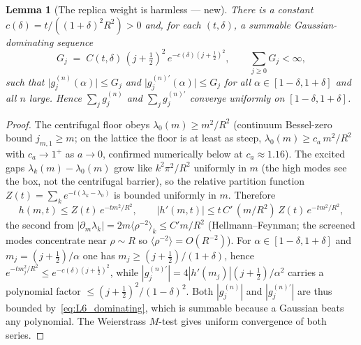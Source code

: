 \documentclass[11pt,a4paper]{article}
\theoremstyle{plain}
\newtheorem{lemma}[theorem]{Lemma}
\theoremstyle{definition}
\renewcommand{\_}{\textunderscore\allowbreak}
\begin{document}
\begin{lemma}[The replica weight is harmless --- new]
\label{lem:L6_harmless}
There is a constant $c(\delta)=t/((1+\delta)^2 R^2)>0$ and, for each $(t,\delta)$,
a summable Gaussian-dominating sequence
\begin{equation}
\label{eq:L6_dominating}
G_j \;=\; C(t,\delta)\,(j+\tfrac12)^2\,e^{-c(\delta)(j+\frac12)^2},
\qquad \sum_{j\ge0}G_j<\infty,
\end{equation}
such that $\big|g_j^{(n)}(\alpha)\big|\le G_j$ and
$\big|g_j^{(n)\prime}(\alpha)\big|\le G_j$ for all $\alpha\in[1-\delta,1+\delta]$
and all $n$ large. Hence $\sum_j g_j^{(n)}$ and $\sum_j g_j^{(n)\prime}$ converge
uniformly on $[1-\delta,1+\delta]$.
\end{lemma}

\begin{proof}
The centrifugal floor obeys $\lambda_0(m)\ge m^2/R^2$ (continuum Bessel-zero
bound $j_{m,1}\ge m$; on the lattice the floor is at least as steep,
$\lambda_0(m)\ge c_a\,m^2/R^2$ with $c_a\to1^+$ as $a\to0$, confirmed
numerically below at $c_a\approx1.16$). The excited gaps
$\lambda_k(m)-\lambda_0(m)$ grow like $k^2\pi^2/R^2$ uniformly in $m$ (the high
modes see the box, not the centrifugal barrier), so the relative partition
function $Z(t)=\sum_k e^{-t(\lambda_k-\lambda_0)}$ is bounded uniformly in $m$.
Therefore
\begin{equation}
h(m,t)\le Z(t)\,e^{-t m^2/R^2},\qquad
|h'(m,t)|\le t\,C'\,(m/R^2)\,Z(t)\,e^{-t m^2/R^2},
\end{equation}
the second from $|\partial_m\lambda_k|=2m\langle\rho^{-2}\rangle_k\le C'm/R^2$
(Hellmann--Feynman; the screened modes concentrate near $\rho\sim R$ so
$\langle\rho^{-2}\rangle=O(R^{-2})$). For $\alpha\in[1-\delta,1+\delta]$ and
$m_j=(j+\tfrac12)/\alpha$ one has $m_j\ge(j+\tfrac12)/(1+\delta)$, hence
$e^{-t m_j^2/R^2}\le e^{-c(\delta)(j+\frac12)^2}$, while
$|g_j^{(n)\prime}|=4|h'(m_j)|(j+\tfrac12)/\alpha^2$ carries a polynomial factor
$\le (j+\tfrac12)^2/(1-\delta)^2$. Both $|g_j^{(n)}|$ and $|g_j^{(n)\prime}|$ are
thus bounded by~\eqref{eq:L6_dominating}, which is summable because a Gaussian
beats any polynomial. The Weierstrass $M$-test gives uniform convergence of both
series.
\end{proof}
\end{document}
